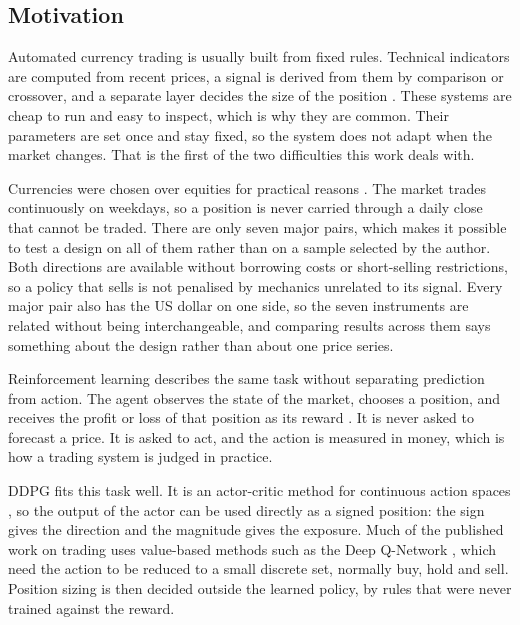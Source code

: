 \subsection{Motivation}

Automated currency trading is usually built from fixed rules. Technical indicators are computed from recent prices, a signal is derived from them by comparison or crossover, and a separate layer decides the size of the position \cite{chan_quantitative_2021, brandimarte_introduction_2018}. These systems are cheap to run and easy to inspect, which is why they are common. Their parameters are set once and stay fixed, so the system does not adapt when the market changes. That is the first of the two difficulties this work deals with.

Currencies were chosen over equities for practical reasons \cite{donnelly_art_2019}. The market trades continuously on weekdays, so a position is never carried through a daily close that cannot be traded. There are only seven major pairs, which makes it possible to test a design on all of them rather than on a sample selected by the author. Both directions are available without borrowing costs or short-selling restrictions, so a policy that sells is not penalised by mechanics unrelated to its signal. Every major pair also has the US dollar on one side, so the seven instruments are related without being interchangeable, and comparing results across them says something about the design rather than about one price series.

Reinforcement learning describes the same task without separating prediction from action. The agent observes the state of the market, chooses a position, and receives the profit or loss of that position as its reward \cite{sutton_reinforcement_2018}. It is never asked to forecast a price. It is asked to act, and the action is measured in money, which is how a trading system is judged in practice.

DDPG fits this task well. It is an actor-critic method for continuous action spaces \cite{lillicrap_continuous_2015}, so the output of the actor can be used directly as a signed position: the sign gives the direction and the magnitude gives the exposure. Much of the published work on trading uses value-based methods such as the Deep Q-Network \cite{mnih_human-level_2015, fischer_reinforcement_2018, hambly_recent_2023}, which need the action to be reduced to a small discrete set, normally buy, hold and sell. Position sizing is then decided outside the learned policy, by rules that were never trained against the reward.

